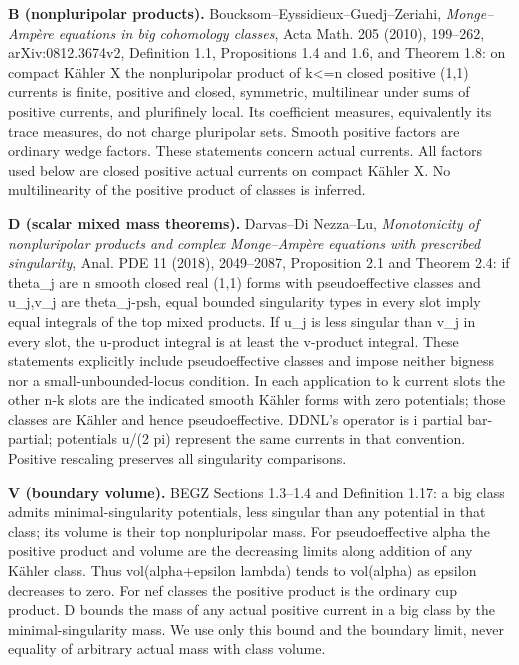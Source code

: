 \documentclass[
]{article}
\begin{document}
\textbf{B (nonpluripolar products).}
Boucksom--Eyssidieux--Guedj--Zeriahi, \emph{Monge--Ampère equations in
big cohomology classes}, Acta Math. 205 (2010), 199--262,
arXiv:0812.3674v2, Definition 1.1, Propositions 1.4 and 1.6, and Theorem
1.8: on compact Kähler X the nonpluripolar product of k\textless=n
closed positive (1,1) currents is finite, positive and closed,
symmetric, multilinear under sums of positive currents, and plurifinely
local. Its coefficient measures, equivalently its trace measures, do not
charge pluripolar sets. Smooth positive factors are ordinary wedge
factors. These statements concern actual currents. All factors used
below are closed positive actual currents on compact Kähler X. No
multilinearity of the positive product of classes is inferred.

\textbf{D (scalar mixed mass theorems).} Darvas--Di Nezza--Lu,
\emph{Monotonicity of nonpluripolar products and complex Monge--Ampère
equations with prescribed singularity}, Anal. PDE 11 (2018), 2049--2087,
Proposition 2.1 and Theorem 2.4: if theta\_j are n smooth closed real
(1,1) forms with pseudoeffective classes and u\_j,v\_j are theta\_j-psh,
equal bounded singularity types in every slot imply equal integrals of
the top mixed products. If u\_j is less singular than v\_j in every
slot, the u-product integral is at least the v-product integral. These
statements explicitly include pseudoeffective classes and impose neither
bigness nor a small-unbounded-locus condition. In each application to k
current slots the other n-k slots are the indicated smooth Kähler forms
with zero potentials; those classes are Kähler and hence
pseudoeffective. DDNL's operator is i partial bar-partial; potentials
u/(2 pi) represent the same currents in that convention. Positive
rescaling preserves all singularity comparisons.

\textbf{V (boundary volume).} BEGZ Sections 1.3--1.4 and Definition
1.17: a big class admits minimal-singularity potentials, less singular
than any potential in that class; its volume is their top nonpluripolar
mass. For pseudoeffective alpha the positive product and volume are the
decreasing limits along addition of any Kähler class. Thus
vol(alpha+epsilon lambda) tends to vol(alpha) as epsilon decreases to
zero. For nef classes the positive product is the ordinary cup product.
D bounds the mass of any actual positive current in a big class by the
minimal-singularity mass. We use only this bound and the boundary limit,
never equality of arbitrary actual mass with class volume.
\end{document}
